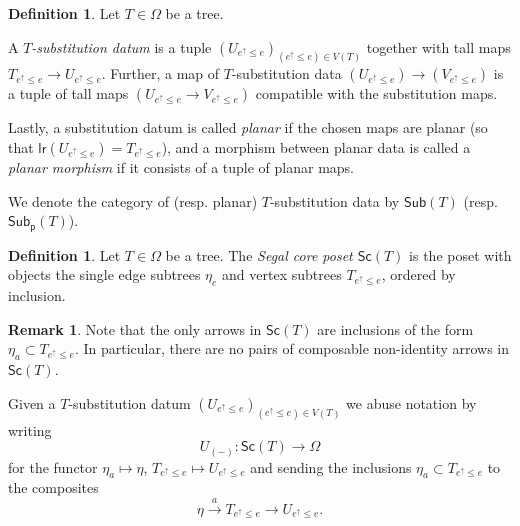 \documentclass[a4paper,10pt
,draft
]{article}%
\numberwithin{equation}{section}
\numberwithin{figure}{section}
\theoremstyle{definition} %
\newtheorem{definition}[equation]{Definition}%
\newtheorem{remark}[equation]{Remark}%
\newcommand{\1}{\ensuremath{\mathbbm 1}}%
\begin{document}
\begin{definition}\label{SUBSTITUTIONDATUM}
	Let $T \in \Omega$ be a tree.
	
	A \textit{$T$-substitution datum} is a tuple 
	$\left(U_{e^{\uparrow} \leq e}\right)_{(e^{\uparrow} \leq e)\in V(T)}$ together with tall maps
	$T_{e^{\uparrow}\leq e} \to U_{e^{\uparrow}\leq e}$.
	Further, a map of $T$-substitution data 
	$\left(U_{e^{\uparrow} \leq e}\right) \to \left(V_{e^{\uparrow} \leq e}\right)$ is a tuple of tall maps $\left(U_{e^{\uparrow} \leq e}\to V_{e^{\uparrow} \leq e}\right)$ compatible with the substitution maps.
	
	Lastly, a substitution datum is called \textit{planar}
        if the chosen maps are planar (so that 
	$\mathsf{lr}(U_{e^{\uparrow} \leq e}) = T_{e^{\uparrow} \leq e}$),
        and a morphism between planar data is called a \textit{planar morphism} if it consists of a tuple of planar maps.
	
	We denote the category of (resp. planar) $T$-substitution data 
	by $\mathsf{Sub}(T)$ (resp. $\mathsf{Sub}_{\mathsf{p}}(T)$).
\end{definition}

\begin{definition}
	Let $T \in \Omega$ be a tree. 
	The \textit{Segal core poset $\mathsf{Sc}(T)$} is the poset with objects the single edge subtrees $\eta_e$ and vertex subtrees $T_{e^{\uparrow} \leq e}$, ordered by inclusion.
\end{definition}


\begin{remark}\label{SCTARR REM}
Note that the only arrows in $\mathsf{Sc}(T)$ are inclusions of the form $\eta_a \subset T_{e^{\uparrow}\leq e}$.
In particular, there are no pairs of composable non-identity arrows in $\mathsf{Sc}(T)$. 
\end{remark}

Given a $T$-substitution datum 
$\left(U_{e^{\uparrow} \leq e}\right)_{(e^{\uparrow} \leq e)\in V(T)}$
we abuse notation by writing
\[U_{(\minus)} \colon \mathsf{Sc}(T) \to \Omega\]
for the functor $\eta_a \mapsto \eta$, $T_{e^{\uparrow} \leq e} \mapsto U_{e^{\uparrow} \leq e}$  
and sending the inclusions $\eta_a \subset T_{e^{\uparrow} \leq e}$
to the composites
\[
\eta \xrightarrow{a} T_{e^{\uparrow} \leq e}  \to 
U_{e^{\uparrow} \leq e}.\]
\end{document}
